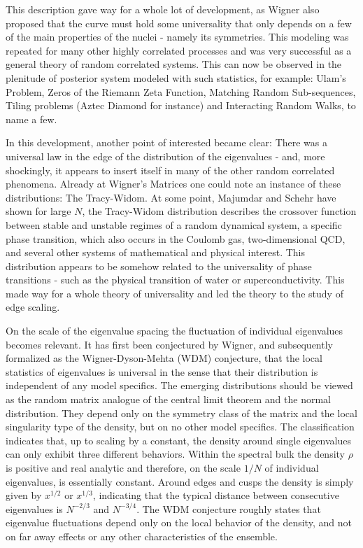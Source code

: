 This description gave way for a whole lot of development, as Wigner also proposed that the curve must hold some universality that only depends on a few of the main properties of the nuclei - namely its symmetries. This modeling was repeated for many other highly correlated processes and was very successful as a general theory of random correlated systems. This can now be observed in the plenitude of posterior system modeled with such statistics, for example: Ulam's Problem, Zeros of the Riemann Zeta Function, Matching Random Sub-sequences, Tiling problems (Aztec Diamond for instance) and Interacting Random Walks, to name a few. 

In this development, another point of interested became clear: There was a universal law in the edge of the distribution of the eigenvalues - and, more shockingly, it appears to insert itself in many of the other random correlated phenomena. Already at Wigner's Matrices one could note an instance of these distributions: The Tracy-Widom. At some point, Majumdar and Schehr have shown for large $N$, the Tracy-Widom distribution describes the crossover function between stable and unstable regimes of a random dynamical system, a specific phase transition, which also occurs in the Coulomb gas, two-dimensional QCD, and several other systems of mathematical and physical interest. This distribution appears to be somehow related to the universality of phase transitions - such as the physical transition of water or superconductivity. This made way for a whole theory of universality and led the theory to the study of edge scaling.

On the scale of the eigenvalue spacing the fluctuation of individual eigenvalues becomes relevant. It has first been conjectured by Wigner, and subsequently formalized as the Wigner-Dyson-Mehta (WDM) conjecture, that the local statistics of eigenvalues is universal in the sense that their distribution is independent of any model specifics. The emerging distributions should be viewed as the random matrix analogue of the central limit theorem and the normal distribution. They depend only on the symmetry class of the matrix and the local singularity type of the density, but on no other model specifics. The classification indicates that, up to scaling by a constant, the density around single eigenvalues can only exhibit three different behaviors. Within the spectral bulk the density $\rho$ is positive and real analytic and therefore, on the scale $1/N$ of individual eigenvalues, is essentially constant. Around edges and cusps the density is simply given by $x^{1/2}$ or $x^{1/3}$, indicating that the typical distance between consecutive eigenvalues is $N^{-2/3}$ and $N^{-3/4}$. The WDM conjecture roughly states that eigenvalue fluctuations depend only on the local behavior of the density, and not on far away effects or any other characteristics of the ensemble.

